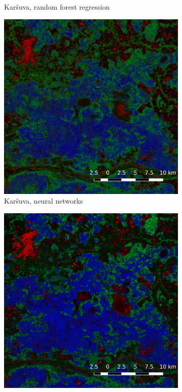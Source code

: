 \documentclass[a4paper,12pt]{scrbook}
\begin{document}
\begin{figure}
\begin{subfigure}[t]{.23\textwidth}
    \caption{Kar\v{s}uva, random forest regression}
    \label{subfig-karsuva-rf}
  \end{subfigure} \hfill
  \begin{subfigure}[t]{.23\textwidth}
    \includegraphics[width=\textwidth]{thesis-figures/figures-qgis/karsuva-nn}
    \caption{Kar\v{s}uva, neural networks}
  \end{subfigure} \hfill
  \begin{subfigure}[t]{.23\textwidth}
    \includegraphics[width=\textwidth]{thesis-figures/figures-qgis/karsuva-cm}

\end{subfigure}
\end{figure}
\end{document}
